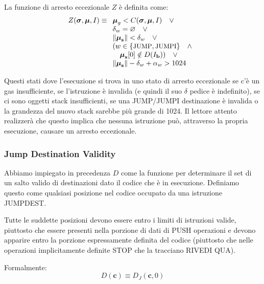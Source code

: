 \documentclass[9pt,oneside]{amsart}
\begin{document}
\begin{multicols}{2}
La funzione di arresto eccezionale $Z$ è definita come:
\begin{equation}
Z(\boldsymbol{\sigma}, \boldsymbol{\mu}, I) \equiv
\begin{array}[t]{l}
\boldsymbol{\mu}_g < C(\boldsymbol{\sigma}, \boldsymbol{\mu}, I) \quad \vee \\
\mathbf{\delta}_w = \varnothing \quad \vee \\
\lVert\boldsymbol{\mu}_\mathbf{s}\rVert < \mathbf{\delta}_w \quad \vee \\
( w \in \{ \text{\small JUMP}, \text{\small JUMPI} \} \quad \wedge \\ \quad \boldsymbol{\mu}_\mathbf{s}[0] \notin D(I_\mathbf{b}) ) \quad \vee \\
\lVert\boldsymbol{\mu}_\mathbf{s}\rVert - \mathbf{\delta}_w + \mathbf{\alpha}_w > 1024 \quad
\end{array}
\end{equation}

Questi stati dove l'esecuzione si trova in uno stato di arresto eccezionale se c'è un gas insufficiente, se l'istruzione è invalida (e quindi il suo $\delta$ pedice è indefinito), se ci sono oggetti stack insufficienti, se una {\small JUMP}/{\small JUMPI} destinazione è invalida o la grandezza del nuovo stack sarebbe più grande di 1024. Il lettore attento realizzerà che questo implica che nessuna istruzione può, attraverso la propria esecuzione, causare un arresto eccezionale.

\subsubsection{Jump Destination Validity}

Abbiamo impiegato in precedenza $D$ come la funzione per determinare il set di un salto valido di destinazioni dato il codice che  è in esecuzione. Definiamo questo come qualsiasi posizione nel codice occupato da una istruzione {\small JUMPDEST}.

Tutte le suddette posizioni devono essere entro i limiti di istruzioni valide, piuttosto che essere presenti nella porzione di dati di {\small PUSH} operazioni e devono apparire entro la porzione espressamente definita del codice (piuttosto che nelle operazioni implicitamente definite {\small STOP} che la tracciano RIVEDI QUA).

Formalmente:
\begin{equation}
D(\mathbf{c}) \equiv D_J(\mathbf{c}, 0)
\end{equation}


\end{multicols}
\end{document}
